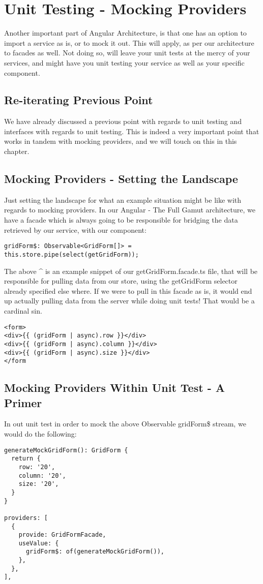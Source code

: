 \maketitle{}
\section{ Unit Testing - Mocking Providers }
Another important part of Angular Architecture, is that one has an option to
import a service as is, or to mock it out. This will apply, as per our
architecture to facades as well. Not doing so, will leave your unit tests at
the mercy of your services, and might have you unit testing your service as
well as your specific component.

\subsection{ Re-iterating Previous Point }
We have already discussed a previous point with regards to unit testing and
interfaces with regards to unit testing. This is indeed a very important point
that works in tandem with mocking providers, and we will touch on this in this
chapter.

\subsection{ Mocking Providers - Setting the Landscape }
Just setting the landscape for what an example situation might be like with
regards to mocking providers. In our Angular - The Full Gamut architecture, we
have a facade which is always going to be responsible for bridging the data
retrieved by our service, with our component:
\begin{lstlisting}
gridForm$: Observable<GridForm[]> = this.store.pipe(select(getGridForm));
\end{lstlisting}

The above ^ is an example snippet of our getGridForm.facade.ts file, that will
be responsible for pulling data from our store, using the getGridForm selector
already specified else where. If we were to pull in this facade as is, it would
end up actually pulling data from the server while doing unit tests! That would
be a cardinal sin.
\begin{verbatim}
<form>
<div>{{ (gridForm | async).row }}</div>
<div>{{ (gridForm | async).column }}</div>
<div>{{ (gridForm | async).size }}</div>
</form
\end{verbatim}

\subsection{ Mocking Providers Within Unit Test - A Primer }
In out unit test in order to mock the above Observable gridForm\$ stream, we
would do the following:
\begin{lstlisting}
generateMockGridForm(): GridForm {
  return {
    row: '20',
    column: '20',
    size: '20',
  }
}

providers: [
  {
    provide: GridFormFacade,
    useValue: {
      gridForm$: of(generateMockGridForm()),
    },
  },
],
\end{lstlisting}

